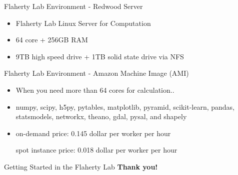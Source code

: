 \documentclass{beamer}
\begin{document}
\begin{frame}{Flaherty Lab Environment - Redwood Server}
	\begin{itemize}
  \item\LARGE{Flaherty Lab Linux Server for Computation}
  \item\LARGE{64 core + 256GB RAM}
  \item\LARGE{9TB high speed drive + 1TB solid state drive via NFS}
	\end{itemize}
\end{frame}

\begin{frame}{Flaherty Lab Environment - Amazon Machine Image (AMI)}
          \begin{itemize}
  \item\LARGE{When you need more than 64 cores for calculation..}
  \item\LARGE{numpy, scipy, h5py, pytables, matplotlib, pyramid, scikit-learn, pandas, statsmodels, networkx, theano, gdal, pysal, and shapely}
  \item\LARGE{on-demand price: 0.145 dollar per worker per hour
  
  spot instance price: 0.018 dollar per worker per hour}
	 \end{itemize}
\end{frame}

\begin{frame}{Getting Started in the Flaherty Lab}
\LARGE\textbf{Thank you!}
\end{frame}
\end{document}
